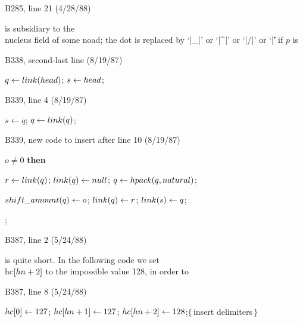 \bugonpage B285, line 21 (4/28/88)

\noindent\tenpoint
is subsidiary to the \\{nucleus} field of some noad; the dot is replaced by
`|_|' or `|^|' or `|/|' or `|\|' if $p$ is\cutpar

\bugonpage B338, second-last line (8/19/87)

\ninepoint\noindent\kern10pt
$q\gets\\{link}(\\{head})$; $s\gets\\{head}$;

\bugonpage B339, line 4 (8/19/87)

\ninepoint\noindent\kern20pt
$s\gets q$; $q\gets\\{link}(q)$;

\bugonpage B339, new code to insert after line 10 (8/19/87)

\ninepoint
\noindent{} $o\ne0$ {\bf then}\par
\noindent{} $r\gets\\{link}(q)$; $\\{link}(q)\gets\\{null}$;
 $q\gets\\{hpack}(q,\\{natural})$;\par
\noindent\kern20pt$\\{shift\_amount}(q)\gets o$; $\\{link}(q)\gets r$;
 $\\{link}(s)\gets q$;\par
\noindent{};\par
{}

\bugonpage B387, line 2 (5/24/88)

\tenpoint\noindent
is quite short. In the following code we set \\{hc}$[\\{hn}+2]$ to the
impossible value 128, in order to\cutpar

\bugonpage B387, line 8 (5/24/88)

\ninepoint\noindent\kern10pt
$\\{hc}[0]\gets127$; $\\{hc}[\\{hn}+1]\gets127$;
 $\\{hc}[\\{hn}+2]\gets128$;\quad$\{\,$insert delimiters$\,\}$

